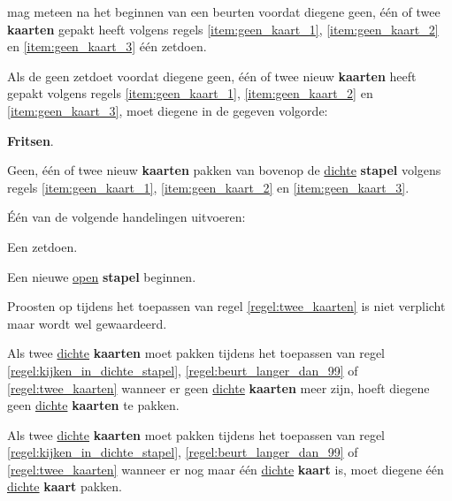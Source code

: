 
\vervolgLijst{}
\item \EenSpeler mag meteen na het beginnen van een beurt\footnotemark[1] en voordat diegene geen, \'e\'en of twee \textbf{kaarten} gepakt heeft volgens regels \ref{item:geen_kaart_1}, \ref{item:geen_kaart_2} en \ref{item:geen_kaart_3} \'e\'en zet\footnotemark[4] doen.
\label{regel:zet_zonder_pakker}
\eindLijst{}

\vervolgLijst{}
\item \label{regel:twee_kaarten} Als de \huidigeSpeler geen zet\footnotemark[4] doet voordat diegene geen, \'e\'en of twee nieuw \textbf{kaarten} heeft gepakt volgens regels \ref{item:geen_kaart_1}, \ref{item:geen_kaart_2} en \ref{item:geen_kaart_3}, moet diegene in de gegeven volgorde:
\puntLijst{}
\item \textbf{Fritsen}.
\item Geen, \'e\'en of twee nieuw \textbf{kaarten} pakken van bovenop de \ul{dichte} \textbf{stapel} volgens regels \ref{item:geen_kaart_1}, \ref{item:geen_kaart_2} en \ref{item:geen_kaart_3}.
\item Één van de volgende handelingen uitvoeren:
\numeriekeLijst{}
\item Een zet\footnotemark[4] doen.
\item Een nieuwe \ul{open} \textbf{stapel} beginnen.
\eindNumeriekeLijst{}
\eindPuntLijst{}
\label{regel:fritsen_en_kaarten_pakken}
\eindLijst{}

\vervolgLijst{}
\item Proosten op  tijdens het toepassen van regel \ref{regel:twee_kaarten} is niet verplicht maar wordt wel gewaardeerd.
\eindLijst{}

\vervolgLijst{}
\item Als \eenSpeler twee \ul{dichte} \textbf{kaarten} moet pakken tijdens het toepassen van regel \ref{regel:kijken_in_dichte_stapel}, \ref{regel:beurt_langer_dan_99} of \ref{regel:twee_kaarten} wanneer er geen \ul{dichte} \textbf{kaarten} meer zijn, hoeft diegene geen \ul{dichte} \textbf{kaarten} te pakken.
\label{item:geen_kaart_1}
\eindLijst{}

\vervolgLijst{}
\item Als \eenSpeler twee \ul{dichte} \textbf{kaarten} moet pakken tijdens het toepassen van regel \ref{regel:kijken_in_dichte_stapel}, \ref{regel:beurt_langer_dan_99} of \ref{regel:twee_kaarten} wanneer er nog maar \'e\'en \ul{dichte} \textbf{kaart} is, moet diegene \'e\'en \ul{dichte} \textbf{kaart} pakken.
\label{item:geen_kaart_2}
\eindLijst{}

